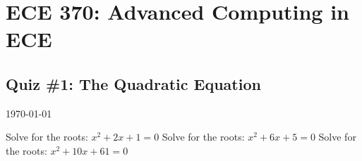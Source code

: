 \documentclass{exam}
\begin{document}
\section*{ECE 370: Advanced Computing in ECE}
\subsection*{Quiz \#1: The Quadratic Equation}
\today \\
\vspace{10mm}
\vspace{3mm}

\begin{questions}
 \question Solve for the roots: \(x^2 +2x + 1 = 0\)
 \question Solve for the roots: \(x^2 +6x + 5 = 0\)
  Solve for the roots: \(x^2 +10x + 61 = 0\)

\end{questions}
\end{document}
